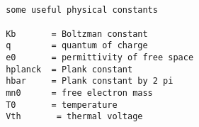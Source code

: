 \begin{verbatim}


 some useful physical constants 

 Kb       = Boltzman constant
 q        = quantum of charge
 e0       = permittivity of free space
 hplanck  = Plank constant
 hbar     = Plank constant by 2 pi
 mn0      = free electron mass
 T0       = temperature
 Vth 	   = thermal voltage


\end{verbatim}

\clearpage
